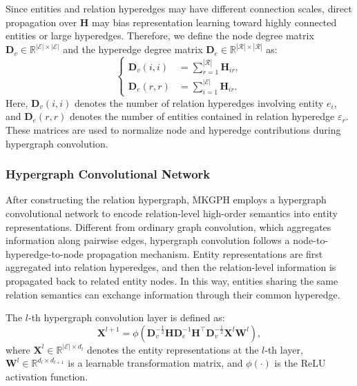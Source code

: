 \documentclass[pdflatex,sn-mathphys-num]{sn-jnl}
\begin{document}
Since entities and relation hyperedges may have different connection scales, direct propagation over $\mathbf{H}$ may bias representation learning toward highly connected entities or large hyperedges. Therefore, we define the node degree matrix $\mathbf{D}_{v}\in\mathbb{R}^{|\mathcal{E}|\times|\mathcal{E}|}$ and the hyperedge degree matrix $\mathbf{D}_{e}\in\mathbb{R}^{|\mathcal{R}|\times|\mathcal{R}|}$ as:
\begin{equation}
\left\{
\begin{aligned}
\mathbf{D}_{v}(i,i) 
&= 
\sum_{r=1}^{|\mathcal{R}|}\mathbf{H}_{ir}, \\
\mathbf{D}_{e}(r,r) 
&= 
\sum_{i=1}^{|\mathcal{E}|}\mathbf{H}_{ir}.
\end{aligned}
\right.
\end{equation}
Here, $\mathbf{D}_{v}(i,i)$ denotes the number of relation hyperedges involving entity $e_i$, and $\mathbf{D}_{e}(r,r)$ denotes the number of entities contained in relation hyperedge $\varepsilon_r$. These matrices are used to normalize node and hyperedge contributions during hypergraph convolution.

\subsubsection{Hypergraph Convolutional Network}

After constructing the relation hypergraph, MKGPH employs a hypergraph convolutional network to encode relation-level high-order semantics into entity representations. Different from ordinary graph convolution, which aggregates information along pairwise edges, hypergraph convolution follows a node-to-hyperedge-to-node propagation mechanism. Entity representations are first aggregated into relation hyperedges, and then the relation-level information is propagated back to related entity nodes. In this way, entities sharing the same relation semantics can exchange information through their common hyperedge.

The $l$-th hypergraph convolution layer is defined as:
\begin{equation}
\mathbf{X}^{l+1}
=
\phi
\left(
\mathbf{D}_{v}^{-\frac{1}{2}}
\mathbf{H}
\mathbf{D}_{e}^{-1}
\mathbf{H}^{\top}
\mathbf{D}_{v}^{-\frac{1}{2}}
\mathbf{X}^{l}
\mathbf{W}^{l}
\right),
\end{equation}
where $\mathbf{X}^{l}\in\mathbb{R}^{|\mathcal{E}|\times d_l}$ denotes the entity representations at the $l$-th layer, $\mathbf{W}^{l}\in\mathbb{R}^{d_l\times d_{l+1}}$ is a learnable transformation matrix, and $\phi(\cdot)$ is the ReLU activation function.
\end{document}
